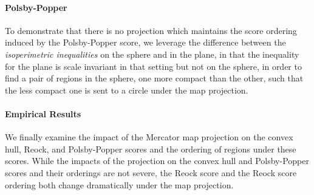 \paragraph{Polsby-Popper}
To demonstrate that there is no projection which maintains the score ordering induced by the Polsby-Popper score,  we leverage the 
difference between the \textit{isoperimetric inequalities} on the sphere and in the plane, in that the inequality for the plane is scale invariant in that setting but not on the sphere, in order to find a pair of regions in the sphere, one more compact than the other, such that the less compact one is sent to a circle under the map projection.

\paragraph{Empirical Results}
We finally examine the impact of the Mercator map projection on the convex hull, Reock, and Polsby-Popper 
scores and the ordering of regions under these scores.  While the impacts of the projection on the convex hull and 
 Polsby-Popper scores and their orderings are not severe, the Reock score and the Reock score ordering both change dramatically 
 under the map projection.




